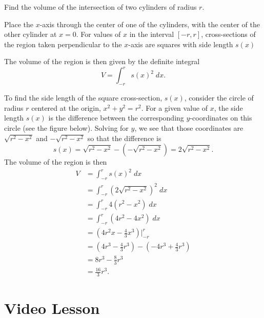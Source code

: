 \documentclass{ximera}
\begin{document}
\begin{example}  Find the volume of the intersection of two cylinders of radius $r$. 


Place the $x$-axis through the center of one of the cylinders, with the center of the other cylinder at $x = 0$.
For values of $x$ in the interval $[-r, r]$, cross-sections of the region taken perpendicular 
to the $x$-axis are squares with side length $s(x)$ %

The volume of the region is then given by the definite integral
\[
V = \int_{-r}^r s(x)^2 \; dx.
\]

To find the side length of the square cross-section, $s(x)$, consider the circle of radius $r$ centered at the origin, $x^2 + y^2 = r^2$. For a given value of $x$, the side 
length $s(x)$ is the difference between the corresponding $y$-coordinates on this circle (see the figure below). Solving for $y$, we see that those coordinates are 
$\sqrt{r^2 - x^2}$ and $-\sqrt{r^2 - x^2}$ so that the difference is 
\[
s(x) = \sqrt{r^2 - x^2}-(-\sqrt{r^2 - x^2}) = 2\sqrt{r^2 - x^2}.
\]
The volume of the region  is then
\begin{align*}
V &= \int_{-r}^r s(x)^2 \; dx\\
  &= \int_{-r}^r \left(2\sqrt{r^2 - x^2}\right)^2 \; dx\\
  &= \int_{-r}^r 4(r^2 - x^2) \; dx\\
  &= \int_{-r}^r (4r^2 - 4x^2) \; dx\\
  &= \left(4r^2x - \frac43x^3\right)\bigg|_{-r}^r\\
  &= \left(4r^3 - \frac43r^3\right) - \left(-4r^3 + \frac43 r^3\right)\\
  &= 8r^3 - \frac83 r^3\\
  &= \frac{16}{3} r^3.
\end{align*}

\end{example}



\section{Video Lesson}

\begin{center}
\begin{foldable}
\end{foldable}
\end{center}
\end{document}
